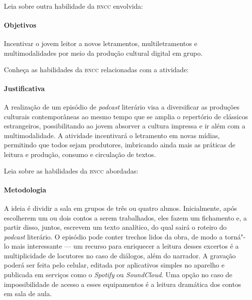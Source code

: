 \documentclass[11pt]{extarticle}
\begin{document}
Leia sobre outra habilidade da \textsc{bncc} envolvida:

\paragraph{Objetivos}
Incentivar o jovem leitor a novos letramentos, multiletramentos e
multimodalidades por meio da produção cultural digital em grupo.


Conheça as habilidades da \textsc{bncc} relacionadas com a atividade:



\paragraph{Justificativa}
A realização de um episódio de \emph{podcast} literário visa a
diversificar as produções culturais contemporâneas ao mesmo tempo que se
amplia o repertório de clássicos estrangeiros, possibilitando ao jovem
absorver a cultura impressa e ir além com a multimodalidade. A atividade
incentivará o letramento em novas mídias, permitindo que todos sejam
produtores, imbricando ainda mais as práticas de leitura e produção,
consumo e circulação de textos.



Leia sobre as habilidades da \textsc{bncc} abordadas:

\paragraph{Metodologia}
A ideia é dividir a sala em grupos de três ou quatro alunos.
Inicialmente, após escolherem um ou dois contos a serem trabalhados,
eles fazem um fichamento e, a partir disso, juntos, escrevem um
texto analítico, do qual sairá o roteiro do \emph{podcast} literário. O
episódio pode conter trechos lidos da obra, de modo a torná"-lo mais
interessante --- um recurso para enriquecer a leitura desses excertos é
a multiplicidade de locutores no caso de diálogos, além do narrador. A
gravação poderá ser feita pelo celular, editada por aplicativos simples
no aparelho e publicada em serviços como o \emph{Spotify} ou
\emph{SoundCloud}. Uma opção no caso de impossibilidade de acesso a
esses equipamentos é a leitura dramática dos contos em sala de aula.
\end{document}
